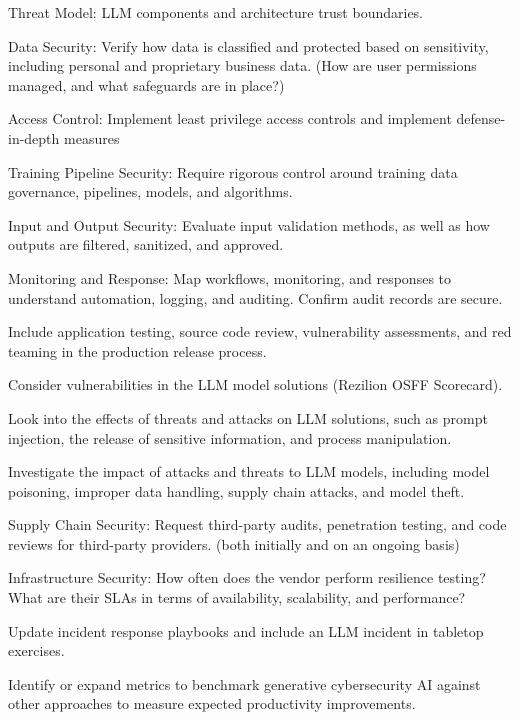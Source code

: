 \begin{minipage}{\linewidth}
\begin{checklist}
  \item Threat Model: LLM components and architecture trust boundaries.
  \item Data Security: Verify how data is classified and protected based on sensitivity, including personal and proprietary business data. (How are user permissions managed, and what safeguards are in place?)
  \item Access Control: Implement least privilege access controls and implement defense-in-depth measures
  \item Training Pipeline Security: Require rigorous control around training data governance, pipelines, models, and algorithms.
  \item Input and Output Security: Evaluate input validation methods, as well as how outputs are filtered, sanitized, and approved.
  \item Monitoring and Response: Map workflows, monitoring, and responses to understand automation, logging, and auditing. Confirm audit records are secure.
  \item Include application testing, source code review, vulnerability assessments, and red teaming in the production release process.
  \item Consider vulnerabilities in the LLM model solutions (Rezilion OSFF Scorecard).
  \item Look into the effects of threats and attacks on LLM solutions, such as prompt injection, the release of sensitive information, and process manipulation.
  \item Investigate the impact of attacks and threats to LLM models, including model poisoning, improper data handling, supply chain attacks, and model theft.
  \item Supply Chain Security: Request third-party audits, penetration testing, and code reviews for third-party providers. (both initially and on an ongoing basis)
  \item Infrastructure Security: How often does the vendor perform resilience testing? What are their SLAs in terms of availability, scalability, and performance?
  \item Update incident response playbooks and include an LLM incident in tabletop exercises.
  \item Identify or expand metrics to benchmark generative cybersecurity AI against other approaches to measure expected productivity improvements.
\end{checklist}
\end{minipage}